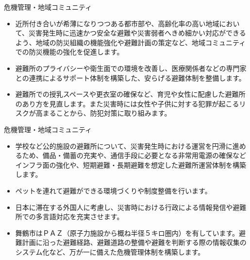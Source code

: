 \documentclass[dvipdfmx]{beamer}
\begin{document}
    \begin{frame}{危機管理・地域コミュニティ}{}
        \begin{small}
            \begin{itemize}
                \setlength{\itemsep}{2mm}
                \item 近所付き合いが希薄になりつつある都市部や、高齢化率の高い地域において、災害発生時に迅速かつ安全な避難や災害弱者へきめ細かい対応ができるよう、地域の防災組織の機能強化や避難計画の策定など、地域コミュニティでの防災機能の強化を促進します。
                \item 避難所のプライバシーや衛生面での環境を改善し、医療関係者などの専門家との連携によるサポート体制を構築した、安らげる避難体制を整備します。
                \item 避難所での授乳スペースや更衣室の確保など、育児や女性に配慮した避難所のあり方を見直します。また災害時には女性や子供に対する犯罪が起こるリスクが高まることから、防犯対策に取り組みます。
            \end{itemize}
        \end{small}
    \end{frame}
    
    \begin{frame}{危機管理・地域コミュニティ}{}
        \begin{small}
            \begin{itemize}
                \setlength{\itemsep}{2mm}
                \item 学校など公的施設の避難所について、災害発生時における運営を円滑に進めるため、備品・備蓄の充実や、通信手段に必要となる非常用電源の確保などインフラ面の強化や、短期避難・長期避難を想定した避難所運営体制を構築します。
                \item ペットを連れて避難ができる環境づくりや制度整備を行います。
                \item 日本に滞在する外国人に考慮し、災害時における行政による情報発信や避難所での多言語対応を充実させます。
                \item 舞鶴市はＰＡＺ（原子力施設から概ね半径５キロ圏内）を有しています。避難計画に沿った避難経路、避難道路の整備や避難を判断する際の情報収集のシステム化など、万が一に備えた危機管理体制を構築します。
            \end{itemize}
        \end{small}
    \end{frame}
    
\end{document}
